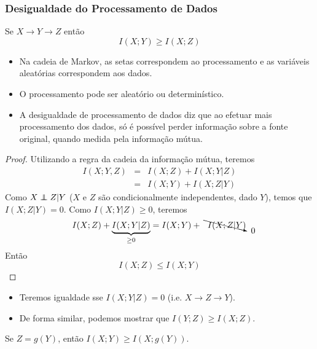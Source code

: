 \begin{frame}[allowframebreaks]
  \frametitle{Desigualdade do Processamento de Dados}
  \begin{theorem}
   Se $X \rightarrow Y \rightarrow Z$ então
  \begin{equation}
        I(X;Y) \geq I(X;Z)
  \end{equation}
  \end{theorem}
  \begin{itemize}
  \item Na cadeia de Markov, as setas correspondem ao processamento e as variáveis aleatórias 
        correspondem aos dados.
  \item O processamento pode ser aleatório ou determinístico.
  \item A desigualdade de processamento de dados diz que ao efetuar mais processamento dos dados,
        só é possível perder informação sobre a fonte original, quando medida pela informação mútua.
  \end{itemize}

  \framebreak

  \begin{proof}
  Utilizando a regra da cadeia da informação mútua, teremos
  \begin{eqnarray}
  I(X;Y,Z) &=& I(X;Z) + I(X;Y|Z) \nonumber \\
        &=& I(X;Y) + I(X;Z|Y)
  \end{eqnarray}
  Como $X \independent Z |Y$ ($X$ e $Z$ são condicionalmente independentes, dado $Y$), temos
  que $I(X;Z|Y)=0$. Como $I(X;Y|Z) \geq 0$, teremos
  \begin{equation}
  I(X;Z) + \underbrace{I(X; Y|Z)}_{\geq 0} = I(X;Y) + \bcancelto{0}{I(X;Z|Y)}
  \end{equation}
  Então
  \begin{equation}
  I(X;Z) \leq I(X;Y)
  \end{equation}
  \end{proof}

  \begin{itemize}
  \item Teremos igualdade sse $I(X;Y|Z)=0$ (i.e. $X \rightarrow Z \rightarrow Y$).
  \item De forma similar, podemos mostrar que $I(Y;Z) \geq I(X;Z)$.
  \end{itemize}

  \begin{corollary}
   Se $Z=g(Y)$, então $I(X;Y) \geq I(X;g(Y))$.


\end{corollary}
\end{frame}
